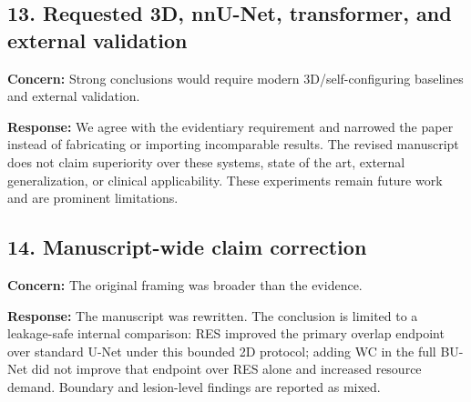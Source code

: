 \documentclass[
  10pt,
  letterpaper,
]{article}
\begin{document}
\subsection{13. Requested 3D, nnU-Net, transformer, and external
validation}\label{requested-3d-nnu-net-transformer-and-external-validation}

\textbf{Concern:} Strong conclusions would require modern
3D/self-configuring baselines and external validation.

\textbf{Response:} We agree with the evidentiary requirement and
narrowed the paper instead of fabricating or importing incomparable
results. The revised manuscript does not claim superiority over these
systems, state of the art, external generalization, or clinical
applicability. These experiments remain future work and are prominent
limitations.

\subsection{14. Manuscript-wide claim
correction}\label{manuscript-wide-claim-correction}

\textbf{Concern:} The original framing was broader than the evidence.

\textbf{Response:} The manuscript was rewritten. The conclusion is
limited to a leakage-safe internal comparison: RES improved the primary
overlap endpoint over standard U-Net under this bounded 2D protocol;
adding WC in the full BU-Net did not improve that endpoint over RES
alone and increased resource demand. Boundary and lesion-level findings
are reported as mixed.
\end{document}
